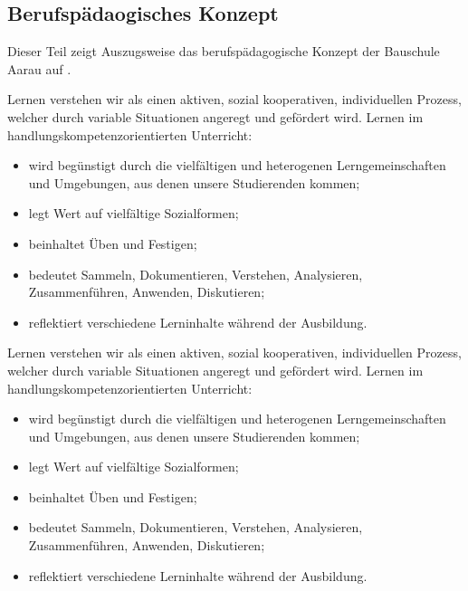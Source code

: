 \documentclass[
11pt,
captions=tableheading,
smallheadings,
headsepline,
footsepline, 
captions=tableheading,
parskip=half-,
]{scrartcl}
\begin{document}



\subsection{Berufspädaogisches Konzept}
Dieser Teil zeigt Auszugsweise das berufspädagogische Konzept der Bauschule Aarau auf \cite{BerufspädagogischesKonzept_BauschuleAarau}.

Lernen verstehen wir als einen aktiven, sozial kooperativen, individuellen Prozess, welcher durch variable Situationen angeregt und gefördert wird. Lernen im handlungskompetenzorientierten Unterricht:
\begin{itemize}
    \item wird begünstigt durch die vielfältigen und heterogenen Lerngemeinschaften und Umgebungen, aus denen unsere Studierenden kommen;
    \item legt Wert auf vielfältige Sozialformen;
    \item beinhaltet Üben und Festigen;
    \item bedeutet Sammeln, Dokumentieren, Verstehen, Analysieren, Zusammenführen, Anwenden, Diskutieren;
    \item reflektiert verschiedene Lerninhalte während der Ausbildung.
\end{itemize}



Lernen verstehen wir als einen aktiven, sozial kooperativen, individuellen Prozess, welcher durch variable Situationen angeregt und gefördert wird. Lernen im handlungskompetenzorientierten Unterricht:
\begin{itemize}
    \item wird begünstigt durch die vielfältigen und heterogenen Lerngemeinschaften und Umgebungen, aus denen unsere Studierenden kommen;
    \item legt Wert auf vielfältige Sozialformen;
    \item beinhaltet Üben und Festigen;
    \item bedeutet Sammeln, Dokumentieren, Verstehen, Analysieren, Zusammenführen, Anwenden, Diskutieren;
    \item reflektiert verschiedene Lerninhalte während der Ausbildung.
\end{itemize}
\end{document}

